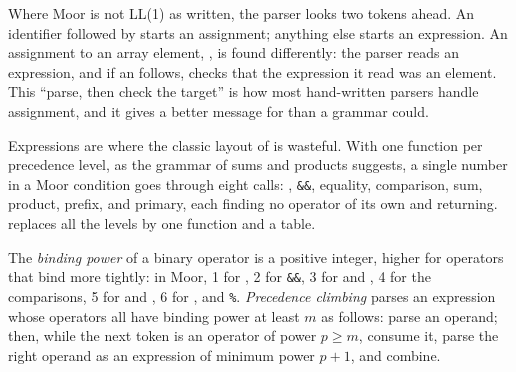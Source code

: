 \label{lst:b3:top-down-parsing:func}

Where Moor is not LL(1) as written, the parser looks two tokens ahead. An identifier followed by \code{=} starts an assignment; anything else starts an expression. An assignment to an array element, , is found differently: the parser reads an expression, and if an \code{=} follows, checks that the expression it read was an element. This ``parse, then check the target'' is how most hand-written parsers handle assignment, and it gives a better message for  than a grammar could.

\label{lst:b3:top-down-parsing:stmt}

Expressions are where the classic layout of  is wasteful. With one function per precedence level, as the grammar of sums and products suggests, a single number in a Moor condition goes through eight calls: \code{||}, \texttt{\&\&}, equality, comparison, sum, product, prefix, and primary, each finding no operator of its own and returning.  replaces all the levels by one function and a table.

\begin{definition}\label{def:b3:top-down-parsing:precedence}
The \emph{binding power} of a binary operator is a positive integer, higher for operators that bind more tightly: in Moor, 1 for \code{||}, 2 for \texttt{\&\&}, 3 for \code{==} and \code{!=}, 4 for the comparisons, 5 for \code{+} and \code{-}, 6 for \code{*}, \code{/} and \texttt{\%}. \emph{Precedence climbing} parses an expression whose operators all have binding power at least $m$ as follows: parse an operand; then, while the next token is an operator of power $p \ge m$, consume it, parse the right operand as an expression of minimum power $p + 1$, and combine.
\end{definition}

\label{lst:b3:top-down-parsing:climb}

